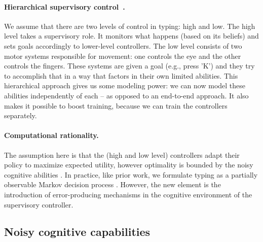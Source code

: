\paragraph{Hierarchical supervisory control~\cite{botvinick2012hierarchical, frank2012mechanisms}.} 
We assume that there are two levels of control in typing: high and low.
The high level takes a supervisory role. 
It monitors what happens (based on its beliefs) and sets goals accordingly to lower-level controllers.
The low level consists of two motor systems responsible for movement: one controls the eye and the other controls the fingers. 
These systems are given a goal (e.g., press 'K') and they try to accomplish that in a way that factors in their own limited abilities.
This hierarchical approach gives us some modeling power: we can now model these abilities independently of each -- as opposed to an end-to-end approach.
It also makes it possible to boost training, because we can train the controllers separately.

\paragraph{Computational rationality.} 
The assumption here is that the (high and low level) controllers adapt their policy to maximize expected utility,
however optimality is bounded by the noisy cognitive abilities \cite{oulasvirta2022computational}. 
In practice, like prior work, we formulate typing as a partially observable Markov decision process \cite{jokinen2017modelling,jokinen2021touchscreen}.
However, the new element is the introduction of error-producing mechanisms in the cognitive environment of the supervisory controller. 

\subsection{Noisy cognitive capabilities}
\label{sec:errors-generating}

